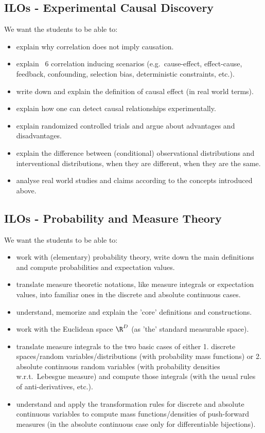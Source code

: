 \subsection*{ILOs - Experimental Causal Discovery}

We want the students to be able to:
\begin{itemize}
\item explain why correlation does not imply causation.
\item explain ~6 correlation inducing scenarios (e.g.\ cause-effect, effect-cause, feedback, 
    confounding, selection bias, deterministic constraints, etc.).
\item write down and explain the definition of causal effect (in real world terms).
\item explain how one can detect causal relationships experimentally.
\item explain randomized controlled trials and argue about advantages and disadvantages.
\item explain the difference between (conditional) observational distributions and interventional distributions, when they are different, when they are the same.
\item analyse real world studies and claims according to the concepts introduced above.

\end{itemize}


\subsection*{ILOs - Probability and Measure Theory}

We want the students to be able to:
\begin{itemize}
\item work with (elementary) probability theory, write down the main definitions and compute probabilities and expectation values.
\item translate measure theoretic notations, like measure integrals or expectation values, into familiar ones 
    in the discrete and absolute continuous cases.
\item understand, memorize and explain the 'core' definitions and constructions.
\item work with the Euclidean space $\R^D$ (as 'the' standard measurable space).
\item translate measure integrals to the two basic cases of either 1. discrete spaces/random variables/distributions (with probability mass functions) or 2. absolute continuous random variables (with probability densities w.r.t.\ Lebesgue measure) and compute those integrals (with the usual rules of anti-derivatives, etc.).
\item understand and apply the transformation rules for discrete and absolute continuous variables to compute mass functions/densities of push-forward measures (in the absolute continuous case only for differentiable bijections).
\end{itemize}


